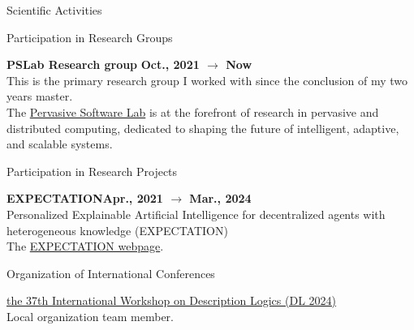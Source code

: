 \documentclass{resume} %
\begin{document}
    \begin{rSection}{Scientific Activities}


        \begin{rSubsection2}{Participation in Research Groups}
            \item\textbf{ PSLab Research group }\hfill \textbf{Oct., 2021 $\rightarrow$ Now}
            \\This is the primary research group I worked with since the conclusion of my two years master.
            \\The \href{https://pslab-unibo.github.io/}{Pervasive Software Lab} is at the forefront of research in pervasive and distributed computing, dedicated to shaping the future of intelligent, adaptive, and scalable systems.
        \end{rSubsection2}


        \begin{rSubsection2}{Participation in Research Projects}
            \item\textbf{EXPECTATION}\hfill \textbf{Apr., 2021 $\rightarrow$ Mar., 2024}
            \\Personalized Explainable Artificial Intelligence for decentralized agents with heterogeneous knowledge (EXPECTATION)
            \\The \href{https://expectation.ehealth.hevs.ch/posts/home/}{EXPECTATION webpage}.
        \end{rSubsection2}


        \begin{rSubsection2}{Organization of International Conferences}
            \item \href{https://dl2024.w.uib.no/organization/}{the 37th International Workshop on Description Logics (DL 2024)}
            \\Local organization team member.
        \end{rSubsection2}


\end{rSection}
\end{document}
